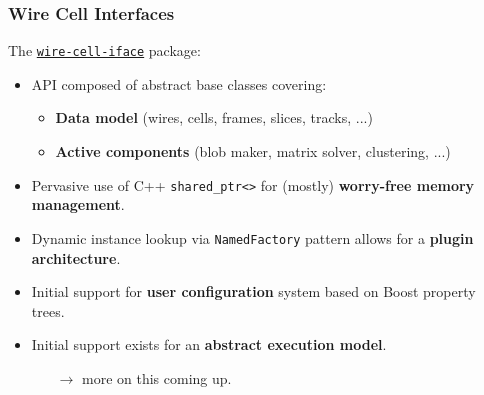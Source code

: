 \documentclass[xcolor=dvipsnames]{beamer}
\begin{document}
\begin{frame}[fragile]
  \frametitle{Wire Cell Interfaces}

  The \href{https://github.com/WireCell/wire-cell-iface}{\texttt{wire-cell-iface}} package:

  \begin{itemize}
  \item API composed of abstract base classes covering:
    \begin{itemize}
    \item \textbf{Data model} (wires, cells, frames, slices, tracks, ...)
    \item \textbf{Active components} (blob maker, matrix solver, clustering, ...)
    \end{itemize}
  \item Pervasive use of C++ \verb|shared_ptr<>| for (mostly) \textbf{worry-free memory management}.
  \item Dynamic instance lookup via \texttt{NamedFactory} pattern
    allows for a \textbf{plugin architecture}.
  \item Initial support for \textbf{user configuration} system based on Boost
    property trees.
  \item Initial support exists for an \textbf{abstract execution model}.
    \begin{itemize}\scriptsize
    \item[$\rightarrow$] more on this coming up.
    \end{itemize}
  \end{itemize}
\end{frame}
\end{document}
